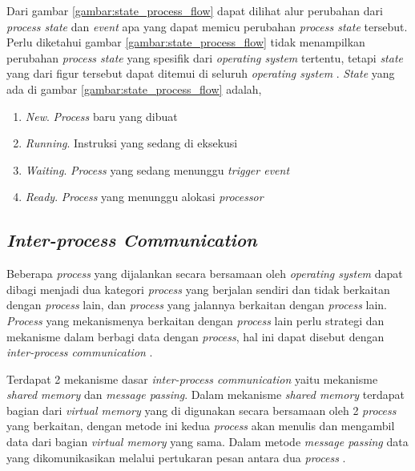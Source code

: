 Dari gambar \ref{gambar:state_process_flow} dapat dilihat alur perubahan dari \emph{process state} dan \emph{event} apa yang dapat memicu perubahan \emph{process state} tersebut. Perlu diketahui gambar \ref{gambar:state_process_flow} tidak menampilkan perubahan \emph{process state} yang spesifik dari \emph{operating system} tertentu, tetapi \emph{state} yang dari figur tersebut dapat ditemui di seluruh \emph{operating system} \citep{operatingsystemconcept}. \emph{State} yang ada di gambar \ref{gambar:state_process_flow} adalah,

\begin{enumerate}
  \item{\emph{New}. \emph{Process} baru yang dibuat}
  \item{\emph{Running}. Instruksi yang sedang di eksekusi}
  \item{\emph{Waiting}. \emph{Process} yang sedang menunggu \emph{trigger event}}
  \item{\emph{Ready}. \emph{Process} yang menunggu alokasi \emph{processor}}
\end{enumerate}

\subsection{\emph{Inter-process Communication}}

Beberapa \emph{process} yang dijalankan secara bersamaan oleh \emph{operating system} dapat dibagi menjadi dua kategori \emph{process} yang berjalan sendiri dan tidak berkaitan dengan \emph{process} lain, dan \emph{process} yang jalannya berkaitan dengan \emph{process} lain. \emph{Process} yang mekanismenya berkaitan dengan \emph{process} lain perlu strategi dan mekanisme dalam berbagi data dengan \emph{process}, hal ini dapat disebut  dengan \emph{inter-process communication} \citep{operatingsystemconcept}.

Terdapat 2 mekanisme dasar \emph{inter-process communication} yaitu mekanisme \emph{shared memory} dan \emph{message passing}. Dalam mekanisme \emph{shared memory} terdapat bagian dari \emph{virtual memory} yang di digunakan secara bersamaan oleh 2 \emph{process} yang berkaitan, dengan metode ini kedua \emph{process} akan menulis dan mengambil data dari bagian \emph{virtual memory} yang sama. Dalam metode \emph{message passing} data yang dikomunikasikan melalui pertukaran pesan antara dua \emph{process} \citep{operatingsystemconcept}. 

